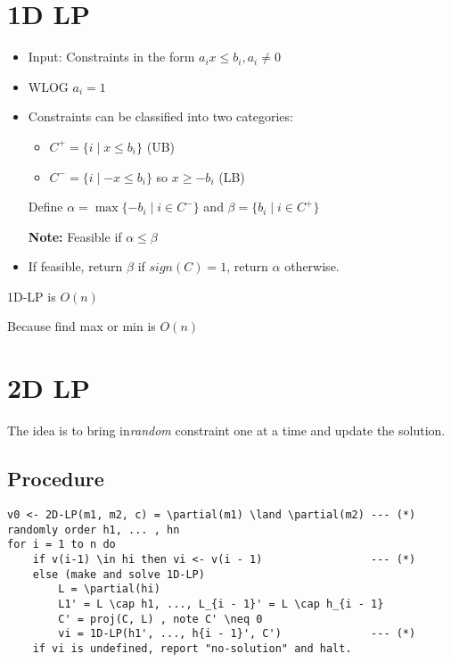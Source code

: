 \documentclass[12pt]{article}
\newcommand{\note}[1]{\par {\bf Note: }{#1}}
\begin{document}
\section{1D LP}
\begin{itemize}
\item Input: Constraints in the form $a_ix \leq b_i, a_i \neq 0$
\item WLOG $a_i = 1$
\item Constraints can be classified into two categories:
  \begin{itemize}
  \item $C^+ = \{i \mid x \leq b_i\}$ (UB)
  \item $C^- = \{i \mid -x \leq b_i\}$ so $x \geq -b_i$ (LB)
  \end{itemize}
  Define $\alpha = \max \{-b_i \mid i \in C^-\}$ and $\beta = \{b_i
  \mid i \in C^+\}$
  \note{Feasible if $\alpha \leq \beta$}
    
  \item If feasible, return $\beta$ if $sign(C) = 1$, return $\alpha$
    otherwise.
\end{itemize}
\begin{theorem}{1D-LP is $O(n)$}
\end{theorem}
Because find max or min is $O(n)$
\section{2D LP}
The idea is to bring in\emph{random} constraint one at a time and
update the solution.
\subsection{Procedure}
\begin{verbatim}
v0 <- 2D-LP(m1, m2, c) = \partial(m1) \land \partial(m2) --- (*)
randomly order h1, ... , hn
for i = 1 to n do
    if v(i-1) \in hi then vi <- v(i - 1)                 --- (*)
    else (make and solve 1D-LP)
        L = \partial(hi)
        L1' = L \cap h1, ..., L_{i - 1}' = L \cap h_{i - 1}
        C' = proj(C, L) , note C' \neq 0
        vi = 1D-LP(h1', ..., h{i - 1}', C')              --- (*)
    if vi is undefined, report "no-solution" and halt.
\end{verbatim}
\end{document}
